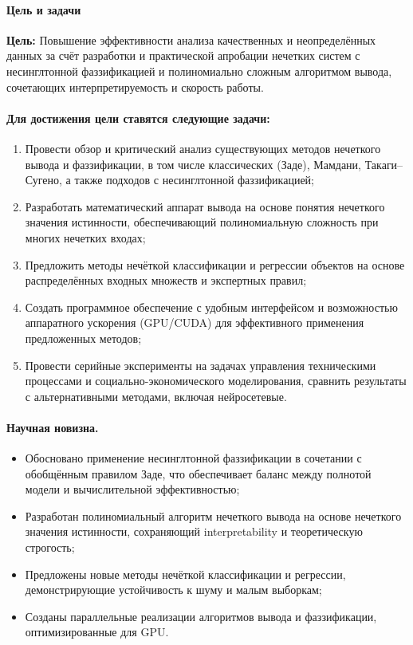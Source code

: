 \paragraph{Цель и задачи}

\textbf{Цель:} Повышение эффективности анализа качественных и неопределённых данных за счёт разработки и практической апробации нечетких систем с несинглтонной фаззификацией и полиномиально сложным алгоритмом вывода, сочетающих интерпретируемость и скорость работы.

\paragraph{Для достижения цели ставятся следующие задачи:}
\begin{enumerate}
  \item Провести обзор и критический анализ существующих методов нечеткого вывода и фаззификации, в том числе классических (Заде), Мамдани, Такаги–Сугено, а также подходов с несинглтонной фаззификацией;
  \item Разработать математический аппарат вывода на основе понятия нечеткого значения истинности, обеспечивающий полиномиальную сложность при многих нечетких входах;
  \item Предложить методы нечёткой классификации и регрессии объектов на основе распределённых входных множеств и экспертных правил;
  \item Создать программное обеспечение с удобным интерфейсом и возможностью аппаратного ускорения (GPU/CUDA) для эффективного применения предложенных методов;
  \item Провести серийные эксперименты на задачах управления техническими процессами и социально-экономического моделирования, сравнить результаты с альтернативными методами, включая нейросетевые.
\end{enumerate}

\paragraph{Научная новизна.}

\begin{itemize}
  \item Обосновано применение несинглтонной фаззификации в сочетании с обобщённым правилом Заде, что обеспечивает баланс между полнотой модели и вычислительной эффективностью;
  \item Разработан полиномиальный алгоритм нечеткого вывода на основе нечеткого значения истинности, сохраняющий interpretability и теоретическую строгость;
  \item Предложены новые методы нечёткой классификации и регрессии, демонстрирующие устойчивость к шуму и малым выборкам;
  \item Созданы параллельные реализации алгоритмов вывода и фаззификации, оптимизированные для GPU.
\end{itemize}

